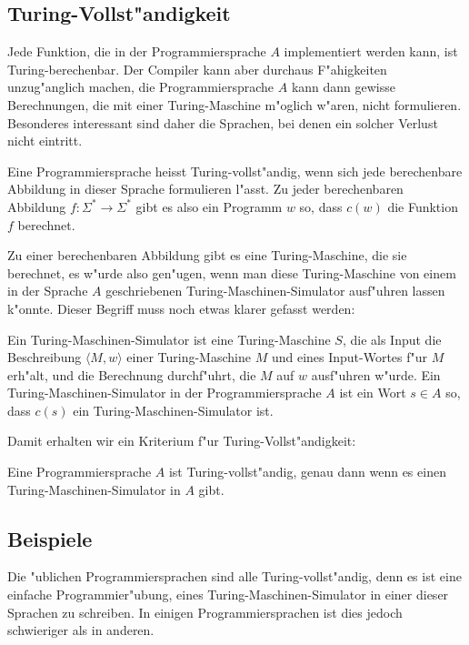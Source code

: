 \subsection{Turing-Vollst"andigkeit}
Jede Funktion, die in der Programmiersprache $A$ implementiert werden
kann, ist Turing-berechenbar.
Der Compiler kann
aber durchaus F"ahigkeiten unzug"anglich machen, die Programmiersprache
$A$ kann dann gewisse Berechnungen, die mit einer Turing-Maschine
m"oglich w"aren, nicht formulieren. Besonderes interessant sind daher
die Sprachen, bei denen ein solcher Verlust nicht eintritt.

\begin{definition}
Eine Programmiersprache heisst Turing-vollst"andig, wenn sich jede
berechenbare Abbildung in dieser Sprache formulieren l"asst.
Zu jeder berechenbaren Abbildung $f\colon\Sigma^*\to \Sigma^*$ gibt
es also ein Programm $w$ so, dass $c(w)$ die Funktion $f$ berechnet.
\end{definition}

Zu einer berechenbaren Abbildung gibt es eine Turing-Maschine, die
sie berechnet, es w"urde also gen"ugen, wenn man diese Turing-Maschine
von einem in der Sprache $A$ geschriebenen Turing-Maschinen-Simulator
ausf"uhren lassen k"onnte. Dieser Begriff muss noch etwas klarer gefasst
werden:

\begin{definition}
Ein Turing-Maschinen-Simulator ist eine Turing-Maschine $S$, die als Input
die Beschreibung $\langle M,w\rangle$ einer Turing-Maschine $M$ und eines
Input-Wortes f"ur $M$ erh"alt, und die Berechnung durchf"uhrt, die $M$ auf $w$
ausf"uhren w"urde.
Ein Turing-Maschinen-Simulator in der Programmiersprache $A$ ist
ein Wort $s\in A$ so, dass $c(s)$ ein Turing-Maschinen-Simulator ist.
\end{definition}

Damit erhalten wir ein Kriterium f"ur Turing-Vollst"andigkeit:

\begin{satz}
\label{turingvollstaendigkeitskriterium}
Eine Programmiersprache $A$ ist Turing-vollst"andig, genau dann
wenn es einen Turing-Maschinen-Simulator in $A$ gibt.
\end{satz}


\subsection{Beispiele}
Die "ublichen Programmiersprachen sind alle Turing-vollst"andig, denn es
ist eine einfache Programmier"ubung, eines Turing-Maschinen-Simulator
in einer dieser Sprachen zu schreiben. In einigen Programmiersprachen
ist dies jedoch schwieriger als in anderen.

